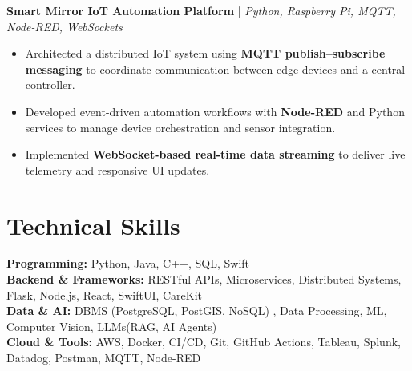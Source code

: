 \documentclass[letterpaper,11pt]{article}
\begin{document}
\textbf{Smart Mirror IoT Automation Platform} \;|\; \textit{Python, Raspberry Pi, MQTT, Node-RED, WebSockets} \\
\begin{itemize}[noitemsep]
    \item Architected a distributed IoT system using \textbf{MQTT publish–subscribe messaging} to coordinate communication between edge devices and a central controller.
    \item Developed event-driven automation workflows with \textbf{Node-RED} and Python services to manage device orchestration and sensor integration.
    \item Implemented \textbf{WebSocket-based real-time data streaming} to deliver live telemetry and responsive UI updates.
\end{itemize}

\section*{Technical Skills}

\textbf{Programming:} Python, Java, C++, SQL, Swift \\

\textbf{Backend \& Frameworks:} RESTful APIs, Microservices, Distributed Systems, Flask, Node.js, React, SwiftUI, CareKit \\

\textbf{Data \& AI:} DBMS (PostgreSQL, PostGIS, NoSQL) , Data Processing, ML, Computer Vision, LLMs(RAG, AI Agents) \\

\textbf{Cloud \& Tools:} AWS, Docker, CI/CD, Git, GitHub Actions, Tableau, Splunk, Datadog, Postman, MQTT, Node-RED
\end{document}
